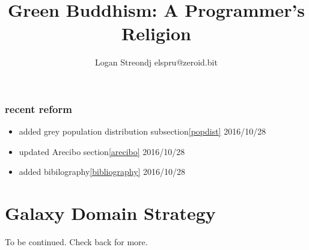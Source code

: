 \documentclass{report}
\title{Green Buddhism: A Programmer's Religion}
\author{Logan Streondj elspru@zeroid.bit}
\begin{document}
\section{recent reform}
\begin{itemize}
  \item added grey population distribution subsection\ref{popdist}
2016/10/28
 \item updated Arecibo section\ref{arecibo} 2016/10/28
 \item added bibilography\ref{bibliography} 2016/10/28
\end{itemize}

\tableofcontents
\part{Galaxy Domain Strategy}









To be continued.
Check back for more.
\end{document}
